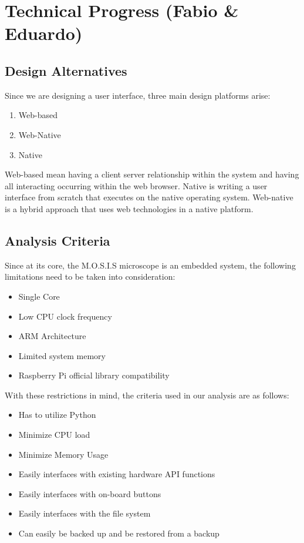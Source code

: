 \section{Technical Progress (Fabio \& Eduardo)}
\subsection{Design Alternatives}
Since we are designing a user interface, three main design platforms arise:
\begin{enumerate}
	\item Web-based
	\item Web-Native
	\item Native
\end{enumerate}
Web-based mean having a client server relationship within the system and having all interacting occurring within the web browser.
Native is writing a user interface from scratch that executes on the native operating system.
Web-native is a hybrid approach that uses web technologies in a native platform.
\subsection{Analysis Criteria}
Since at its core, the M.O.S.I.S microscope is an embedded system, the following limitations need to be taken into consideration:
\begin{itemize}
	\item Single Core
	\item Low CPU clock frequency
	\item ARM Architecture
	\item Limited system memory
	\item Raspberry Pi official library compatibility
\end{itemize}
With these restrictions in mind, the criteria used in our analysis are as follows:
\begin{itemize}
	\item Has to utilize Python
	\item Minimize CPU load
	\item Minimize Memory Usage
	\item Easily interfaces with existing hardware API functions
	\item Easily interfaces with on-board buttons
	\item Easily interfaces with the file system
	\item Can easily be backed up and be restored from a backup
\end{itemize}
